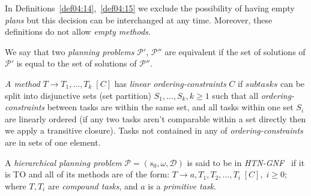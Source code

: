 \medskip\noindent
In Definitions~\ref{def04:14},~\ref{def04:15} we exclude the possibility of having empty \emph{plans} but this decision can be interchanged at any time. Moreover, these definitions do not allow \emph{empty methods}.

\begin{defn}\label{def04:16}
    We say that two \emph{planning problems} $\mathcal{P'}$, $\mathcal{P''}$ are equivalent if the set of solutions of $\mathcal{P'}$ is equal to the set of solutions of $\mathcal{P''}$.
\end{defn}

\begin{defn}\label{def04:17}
    \emph{A method} $T \rightarrow T_1, \dots, T_k \; [C]$ has \emph{linear ordering-constraints} $C$ if $subtasks$ can be split into disjunctive sets (set partition) $S_1, \dots, S_k, k \geq 1$ such that all \emph{ordering-constraints} between tasks are within the same set, and all tasks within one set $S_i$ are linearly ordered (if any two tasks aren't comparable within a set directly then we apply a transitive closure). Tasks not contained in any of \emph{ordering-constraints} are in sets of one element.
\end{defn}

\begin{defn}\label{def04:18}
    A \emph{hierarchical planning problem} $\mathcal{P} = (s_0,\omega,\mathcal{D})$ is said to be in \emph{HTN-GNF~\cite{gnf}} if it is TO and all of its methods are of the form: $T \rightarrow a, T_1, T_2, \dots, T_i \; [C], \; i \geq 0$; where $T, T_i$ are \emph{compound tasks}, and $a$ is a \emph{primitive task}. 
\end{defn}

